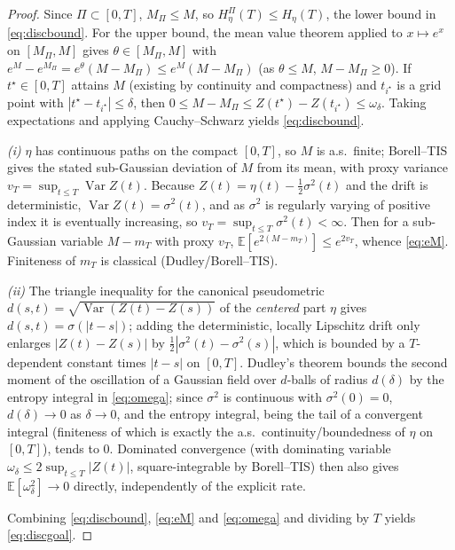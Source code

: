 \documentclass{amsart}
\theoremstyle{definition}
\DeclareMathOperator{\Var}{Var}
\newcommand{\E}{\mathbb{E}}
\begin{document}
\begin{proof}
Since $\Pi\subset[0,T]$, $M_\Pi\le M$, so $H_\eta^\Pi(T)\le H_\eta(T)$, the lower
bound in \eqref{eq:discbound}. For the upper bound, the mean value theorem applied
to $x\mapsto e^x$ on $[M_\Pi,M]$ gives $\theta\in[M_\Pi,M]$ with
$e^M-e^{M_\Pi}=e^{\theta}(M-M_\Pi)\le e^M(M-M_\Pi)$ (as $\theta\le M$,
$M-M_\Pi\ge0$). If $t^\star\in[0,T]$ attains $M$ (existing by continuity and
compactness) and $t_{i^\star}$ is a grid point with $|t^\star-t_{i^\star}|\le\delta$,
then $0\le M-M_\Pi\le Z(t^\star)-Z(t_{i^\star})\le\omega_\delta$. Taking
expectations and applying Cauchy--Schwarz yields \eqref{eq:discbound}.

\emph{(i)} $\eta$ has continuous paths on the compact $[0,T]$, so $M$ is a.s.\
finite; Borell--TIS gives the stated sub-Gaussian deviation of $M$ from its mean,
with proxy variance $v_T=\sup_{t\le T}\Var Z(t)$. Because $Z(t)=\eta(t)-\tfrac12
\sigma^2(t)$ and the drift is deterministic, $\Var Z(t)=\sigma^2(t)$, and as
$\sigma^2$ is regularly varying of positive index it is eventually increasing, so
$v_T=\sup_{t\le T}\sigma^2(t)<\infty$. Then for a sub-Gaussian variable
$M-m_T$ with proxy $v_T$, $\E[e^{2(M-m_T)}]\le e^{2v_T}$, whence \eqref{eq:eM}.
Finiteness of $m_T$ is classical (Dudley/Borell--TIS).

\emph{(ii)} The triangle inequality for the canonical pseudometric
$d(s,t)=\sqrt{\Var(Z(t)-Z(s))}$ of the \emph{centered} part $\eta$ gives
$d(s,t)=\sigma(|t-s|)$; adding the deterministic, locally Lipschitz drift only
enlarges $|Z(t)-Z(s)|$ by $\tfrac12|\sigma^2(t)-\sigma^2(s)|$, which is bounded by
a $T$-dependent constant times $|t-s|$ on $[0,T]$. Dudley's theorem bounds the
second moment of the oscillation of a Gaussian field over $d$-balls of radius
$d(\delta)$ by the entropy integral in \eqref{eq:omega}; since $\sigma^2$ is
continuous with $\sigma^2(0)=0$, $d(\delta)\to0$ as $\delta\to0$, and the entropy
integral, being the tail of a convergent integral (finiteness of which is exactly
the a.s.\ continuity/boundedness of $\eta$ on $[0,T]$), tends to $0$. Dominated
convergence (with dominating variable $\omega_\delta\le2\sup_{t\le T}|Z(t)|$,
square-integrable by Borell--TIS) then also gives $\E[\omega_\delta^2]\to0$ directly,
independently of the explicit rate.

Combining \eqref{eq:discbound}, \eqref{eq:eM} and \eqref{eq:omega} and dividing by
$T$ yields \eqref{eq:discgoal}.
\end{proof}
\end{document}
